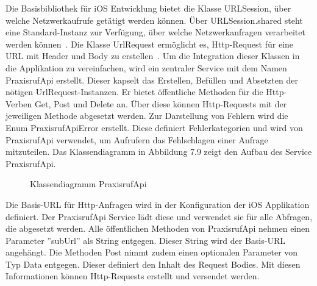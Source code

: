 Die Basisbibliothek für iOS Entwicklung bietet die Klasse URLSession, über welche Netzwerkaufrufe getätigt werden können.
Über URLSession.shared steht eine Standard-Instanz zur Verfügung, über welche Netzwerkanfragen verarbeitet werden können~\cite{ios_urlsession}.
Die Klasse UrlRequest ermöglicht es, Http-Request für eine URL mit Header und Body zu erstellen~\cite{ios_urlrequest}.
Um die Integration dieser Klassen in die Applikation zu vereinfachen, wird ein zentraler Service mit dem Namen PraxisrufApi erstellt.
Dieser kapselt das Erstellen, Befüllen und Absetzten der nötigen UrlRequest-Instanzen.
Er bietet öffentliche Methoden für die Http-Verben Get, Post und Delete an.
Über diese können Http-Requests mit der jeweiligen Methode abgesetzt werden.
Zur Darstellung von Fehlern wird die Enum PraxisrufApiError erstellt.
Diese definiert Fehlerkategorien und wird von PraxisrufApi verwendet, um Aufrufern das Fehlschlagen einer Anfrage mitzuteilen.
Das Klassendiagramm in Abbildung 7.9 zeigt den Aufbau des Service PraxisrufApi\@.

\begin{figure}[h]
    \centering
    \begin{minipage}[b]{0.8\textwidth}
        \caption{Klassendiagramm PraxisrufApi}
    \end{minipage}
\end{figure}

Die Basis-URL für Http-Anfragen wird in der Konfiguration der iOS Applikation definiert.
Der PraxisrufApi Service lädt diese und verwendet sie für alle Abfragen, die abgesetzt werden.
Alle öffentlichen Methoden von PraxisrufApi nehmen einen Parameter ''subUrl'' als String entgegen.
Dieser String wird der Basis-URL angehängt.
Die Methoden Post nimmt zudem einen optionalen Parameter von Typ Data entgegen.
Dieser definiert den Inhalt des Request Bodies.
Mit diesen Informationen können Http-Requests erstellt und versendet werden.

